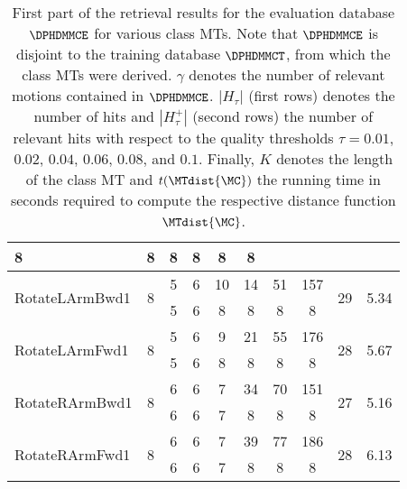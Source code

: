 \begin{table}[t]
\begin{center}
\begin{tabular}{|l|c|*{6}{c}|c|r|}
{\tiny    8} & {\tiny    8} & {\tiny    8} & {\tiny    8} & {\tiny    8} & {\tiny    8} & & \\
\hline \multirow{2}{*}{      RotateLArmBwd1} & \multirow{2}{*}{
8} & {\tiny    5} & {\tiny    6} & {\tiny   10} & {\tiny   14} &
{\tiny   51} & {\tiny  157} & \multirow{2}{*}{    29} &
\multirow{2}{*}{  5.34} \\ & &
{\tiny    5} & {\tiny    6} & {\tiny    8} & {\tiny    8} & {\tiny    8} & {\tiny    8} & & \\
\hline \multirow{2}{*}{       RotateLArmFwd1} & \multirow{2}{*}{
8} & {\tiny    5} & {\tiny    6} & {\tiny    9} & {\tiny   21} &
{\tiny   55} & {\tiny  176} & \multirow{2}{*}{    28} &
\multirow{2}{*}{  5.67} \\ & &
{\tiny    5} & {\tiny    6} & {\tiny    8} & {\tiny    8} & {\tiny    8} & {\tiny    8} & & \\
\multirow{2}{*}{      RotateRArmBwd1} & \multirow{2}{*}{   8} &
{\tiny 6} & {\tiny    6} & {\tiny    7} & {\tiny   34} & {\tiny
70} & {\tiny  151} & \multirow{2}{*}{    27} & \multirow{2}{*}{
5.16} \\ & &
{\tiny    6} & {\tiny    6} & {\tiny    7} & {\tiny    8} & {\tiny    8} & {\tiny    8} & & \\
\hline \multirow{2}{*}{       RotateRArmFwd1} & \multirow{2}{*}{
8} & {\tiny    6} & {\tiny    6} & {\tiny    7} & {\tiny   39} &
{\tiny   77} & {\tiny  186} & \multirow{2}{*}{    28} &
\multirow{2}{*}{  6.13} \\ & &
{\tiny    6} & {\tiny    6} & {\tiny    7} & {\tiny    8} & {\tiny    8} & {\tiny    8} & & \\
\hline
\end{tabular}
\end{center}
\caption[Retrieval results on $\DPHDMMCE$, part 1]{First part of
the retrieval results for the evaluation database $\DPHDMMCE$
for various class MTs.
   Note that $\DPHDMMCE$ is disjoint to the training database $\DPHDMMCT$, from
   which the class MTs were derived.
   $\gamma$ denotes the number of relevant motions contained in  $\DPHDMMCE$.
   $|H_{\tau}|$ (first rows) denotes the number of hits and
   $|H_{\tau}^+|$ (second rows) the number of relevant hits with respect
   to the quality thresholds $\tau=0.01$, $0.02$,
   $0.04$, $0.06$, $0.08$, and $0.1$. Finally, $K$ denotes the length of the
   class MT and $t(\MTdist{\MC})$ the running time in seconds required to compute the
   respective distance function $\MTdist{\MC}$.
   }
\label{table:MTretrievalMCE1}
\end{table}

